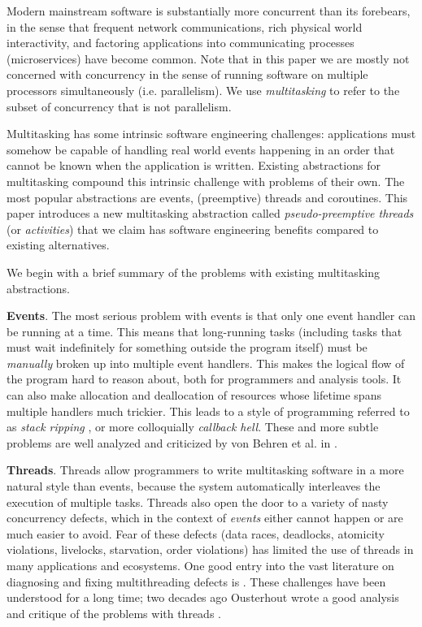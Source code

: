 \documentclass[10pt,preprint]{sigplanconf}
\begin{document}
Modern mainstream software is substantially more concurrent than its forebears, in the sense that frequent network communications, rich physical world interactivity, and factoring applications into communicating processes (microservices) have become common.
Note that in this paper we are mostly not concerned with concurrency in the sense of running software on multiple processors simultaneously (i.e. parallelism).
We use \emph{multitasking} to refer to the subset of concurrency that is not parallelism.

Multitasking has some intrinsic software engineering challenges: applications must somehow be capable of handling real world events happening in an order that cannot be known when the application is written.
Existing abstractions for multitasking compound this intrinsic challenge with problems of their own.
The most popular abstractions are events, (preemptive) threads and coroutines.
This paper introduces a new multitasking abstraction called \emph{pseudo-preemptive threads} (or \emph{activities}) that we claim has software engineering benefits compared to existing alternatives.

We begin with a brief summary of the problems with existing multitasking abstractions.

\textbf{Events}.
The most serious problem with events is that only one event handler can be running at a time.
This means that long-running tasks (including tasks that must wait indefinitely for something outside the program itself) must be \emph{manually} broken up into multiple event handlers.
This makes the logical flow of the program hard to reason about, both for programmers and analysis tools.
It can also make allocation and deallocation of resources whose lifetime spans multiple handlers much trickier.
This leads to a style of programming referred to as \emph{stack ripping} \cite{Adya2002}, or more colloquially \emph{callback hell}.
These and more subtle problems are well analyzed and criticized by von Behren et al. in \cite{Behren2003a}.

\textbf{Threads}.
Threads allow programmers to write multitasking software in a more natural style than events, because the system automatically interleaves the execution of multiple tasks.
Threads also open the door to a variety of nasty concurrency defects, which in the context of \emph{events} either cannot happen or are much easier to avoid.
Fear of these defects (data races, deadlocks, atomicity violations, livelocks, starvation, order violations) has limited the use of threads in many applications and ecosystems.
One good entry into the vast literature on diagnosing and fixing multithreading defects is \cite{Lu2008}.
These challenges have been understood for a long time; two decades ago Ousterhout wrote a good analysis and critique of the problems with threads \cite{Ousterhout1996}.
\end{document}
